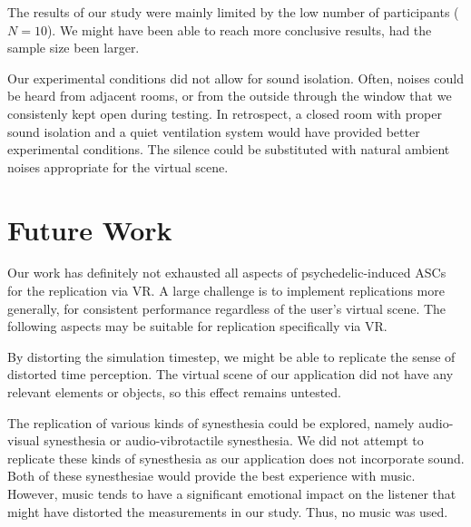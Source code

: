 The results of our study were mainly limited by the low number of participants ($N=10$). We might have been able to reach more conclusive results, had the sample size been larger.

Our experimental conditions did not allow for sound isolation. Often, noises could be heard from adjacent rooms, or from the outside through the window that we consistenly kept open during testing. In retrospect, a closed room with proper sound isolation and a quiet ventilation system would have provided better experimental conditions. The silence could be substituted with natural ambient noises appropriate for the virtual scene.

\section{Future Work}
Our work has definitely not exhausted all aspects of psychedelic-induced \acp{ASC} for the replication via \ac{VR}. A large challenge is to implement replications more generally, for consistent performance regardless of the user's virtual scene. The following aspects may be suitable for replication specifically via \ac{VR}.

By distorting the simulation timestep, we might be able to replicate the sense of distorted time perception. The virtual scene of our application did not have any relevant elements or objects, so this effect remains untested.

The replication of various kinds of synesthesia could be explored, namely audio-visual synesthesia or audio-vibrotactile synesthesia. We did not attempt to replicate these kinds of synesthesia as our application does not incorporate sound. Both of these synesthesiae would provide the best experience with music. However, music tends to have a significant emotional impact on the listener that might have distorted the measurements in our study. Thus, no music was used.

